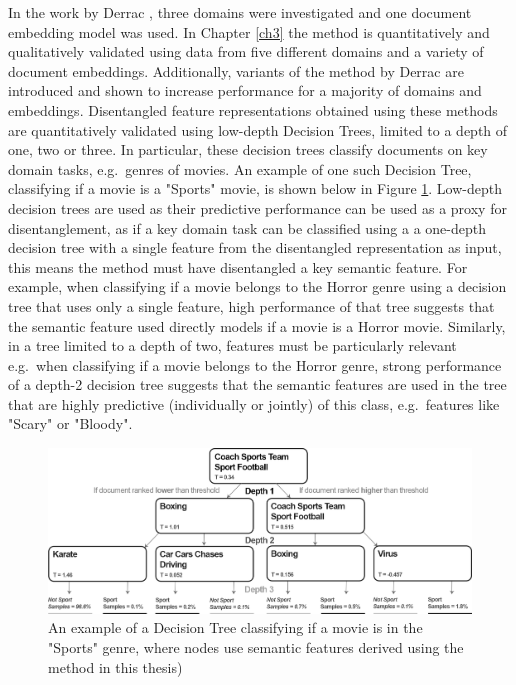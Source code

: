 In the work by Derrac  \cite{Derrac2015}, three domains were investigated and one document embedding model was used. In Chapter \ref{ch3} the method is quantitatively and qualitatively validated using data from five different domains and a variety of document embeddings. Additionally, variants of the method by Derrac \cite{Derrac2015} are introduced and shown to increase performance for a majority of domains and embeddings.  Disentangled feature representations obtained using these methods are quantitatively validated using  low-depth Decision Trees, limited to a depth of one, two or three. In particular, these decision trees classify documents on key domain tasks, e.g.\ genres of movies. An example of one such Decision Tree, classifying if a movie is a "Sports" movie, is shown below in Figure \ref{ch1:DecisionTree}. Low-depth decision trees are used as their predictive performance can be used as a proxy for disentanglement, as if a key domain task can be classified using a a one-depth decision tree with a single feature from the disentangled representation as input, this means the method must have disentangled a key semantic feature. For example, when classifying if a movie belongs to the Horror genre using  a decision tree that uses only a single feature,  high performance of that tree suggests that the semantic feature used directly models if a movie is a Horror movie. Similarly, in a tree limited to a depth of two,  features must be particularly relevant e.g.\ when classifying if a movie belongs to the Horror genre, strong performance of a depth-2 decision tree suggests that the semantic features are used in the tree that are highly predictive (individually or jointly) of this class, e.g.\ features like "Scary" or "Bloody". 

\begin{figure}[t]
	\includegraphics[width=450px]{images/decision_tree_ex.png}
	\centering
	\caption{An example of a Decision Tree classifying if a movie is in the "Sports" genre, where nodes use semantic features derived using the method in this thesis)}\label{ch1:DecisionTree}
\end{figure}

